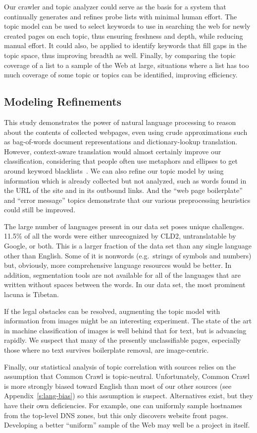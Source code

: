 Our crawler and topic analyzer could serve as the basis for a system
that continually generates and refines probe lists with minimal human
effort.  The topic model can be used to select keywords to use in
searching the web for newly created pages on each topic, thus ensuring
freshness and depth, while reducing manual effort.  It could also, be
applied to identify keywords that fill gaps in the topic space, thus
improving breadth as well.  Finally, by comparing the topic coverage
of a list to a sample of the Web at large, situations where a list has
too much coverage of some topic or topics can be identified, improving
efficiency.

\subsection{Modeling Refinements}

This study demonstrates the power of natural language processing to
reason about the contents of collected webpages, even using crude
approximations such as bag-of-words document representations and
dictionary-lookup translation.  However, context-aware translation
would almost certainly improve our classification, considering that
people often use metaphors and ellipses to get around keyword
blacklists~\cite{crandall2007.conceptdoppler}.  We can also refine our
topic model by using information which is already collected but not
analyzed, such as words found in the URL of the site and in its
outbound links.  And the “web page boilerplate” and “error message”
topics demonstrate that our various preprocessing heuristics could
still be improved.

The large number of languages present in our data set poses unique
challenges.  11.5\% of all the words were either unrecognized by CLD2,
untranslatable by Google, or both.  This is a larger fraction of the
data set than any single language other than English.  Some of it is
nonwords (e.g.\ strings of symbols and numbers) but, obviously, more
comprehensive language resources would be better.  In addition,
segmentation tools are not available for all of the languages that are
written without spaces between the words.  In our data set, the most
prominent lacuna is Tibetan.

If the legal obstacles can be resolved, augmenting the topic model
with information from images might be an interesting experiment.  The
state of the art in machine classification of images is well behind
that for text, but is advancing rapidly.  We suspect that many of the
presently unclassifiable pages, especially those where no text
survives boilerplate removal, are image-centric.

Finally, our statistical analysis of topic correlation with sources
relies on the assumption that Common Crawl is topic-neutral.
Unfortunately, Common Crawl is more strongly biased toward English
than most of our other sources (see Appendix~\ref{s:lang-bias}) so
this assumption is suspect.  Alternatives exist, but they have their
own deficiencies. For example, one can uniformly sample hostnames from
the top-level DNS zones, but this only discovers website front pages.
Developing a better “uniform” sample of the Web may well be a
project in itself.
